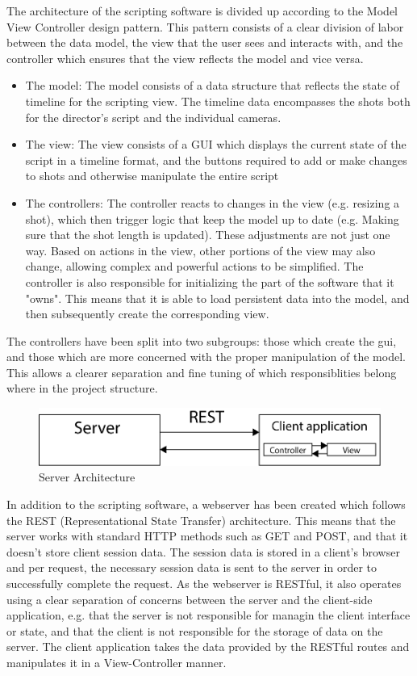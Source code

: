 \documentclass[11pt,twoside,a4paper]{article}
\begin{document}
The architecture of the scripting software is divided up according to the Model View Controller design pattern. This pattern consists of a clear division of labor between the data model, the view that the user sees and interacts with, and the controller which ensures that the view reflects the model and vice versa.
\begin{itemize}
    \item The model: The model consists of a data structure that reflects the state of timeline for the scripting view. The timeline data encompasses the shots both for the director's script and the individual cameras.
    \item The view: The view consists of a GUI which displays the current state of the script in a timeline format, and the buttons required to add or make changes to shots and otherwise manipulate the entire script
    \item The controllers: The controller reacts to changes in the view (e.g. resizing a shot), which then trigger logic that keep the model up to date (e.g. Making sure that the shot length is updated). These adjustments are not just one way. Based on actions in the view, other portions of the view may also change, allowing complex and powerful actions to be simplified. The controller is also responsible for initializing the part of the software that it "owns". This means that it is able to load persistent data into the model, and then subsequently create the corresponding view.
\end{itemize}
The controllers have been split into two subgroups: those which create the gui, and those which are more concerned with the proper manipulation of the model. This allows a clearer separation and fine tuning of which responsiblities belong where in the project structure.\\
\begin{figure}[H]
	\centering
	\includegraphics[width=\textwidth]{server-decomposition}
	\caption{Server Architecture}
	\label{fig:archdecomp}
\end{figure}
In addition to the scripting software, a webserver has been created which follows the REST (Representational State Transfer) architecture. This means that the server works with standard HTTP methods such as GET and POST, and that it doesn't store client session data. The session data is stored in a client's browser and per request, the necessary session data is sent to the server in order to successfully complete the request. As the webserver is RESTful, it also operates using a clear separation of concerns between the server and the client-side application, e.g. that the server is not responsible for managin the client interface or state, and that the client is not responsible for the storage of data on the server. The client application takes the data provided by the RESTful routes and manipulates it in a View-Controller manner.
\end{document}
